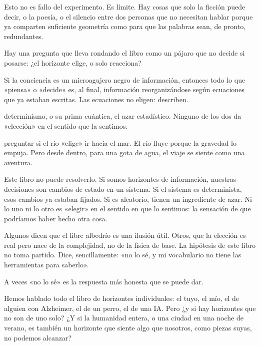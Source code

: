 Esto no es fallo del experimento. Es límite. Hay cosas que solo la ficción puede decir, o la poesía, o el silencio entre dos personas que no necesitan hablar porque ya comparten suficiente geometría como para que las palabras sean, de pronto, redundantes.

\noindent Hay una pregunta que lleva rondando el libro como un pájaro que no decide si posarse: ¿el horizonte elige, o solo reacciona?

Si la conciencia es un microagujero negro de información, entonces todo lo que «piensa» o «decide» es, al final, información reorganizándose según ecuaciones que ya estaban escritas. Las ecuaciones no eligen: describen.

\begin{fisica}
 determinismo, o su prima cuántica, el azar estadístico. Ninguno de los dos da «elección» en el sentido que la sentimos.

 preguntar si el río «elige» ir hacia el mar. El río fluye porque la gravedad lo empuja. Pero desde dentro, para una gota de agua, el viaje se siente como una aventura.
\end{fisica}
Este libro no puede resolverlo. Si somos horizontes de información, nuestras decisiones son cambios de estado en un sistema. Si el sistema es determinista, esos cambios ya estaban fijados. Si es aleatorio, tienen un ingrediente de azar. Ni lo uno ni lo otro es «elegir» en el sentido en que lo sentimos: la sensación de que podríamos haber hecho otra cosa.

Algunos dicen que el libre albedrío es una ilusión útil. Otros, que la elección es real pero nace de la complejidad, no de la física de base. La hipótesis de este libro no toma partido. Dice, sencillamente: «no lo sé, y mi vocabulario no tiene las herramientas para saberlo».

A veces «no lo sé» es la respuesta más honesta que se puede dar.

\noindent Hemos hablado todo el libro de horizontes individuales: el tuyo, el mío, el de alguien con Alzheimer, el de un perro, el de una IA. Pero ¿y si hay horizontes que no son de uno solo? ¿Y si la humanidad entera, o una ciudad en una noche de verano, es también un horizonte que siente algo que nosotros, como piezas suyas, no podemos alcanzar?

